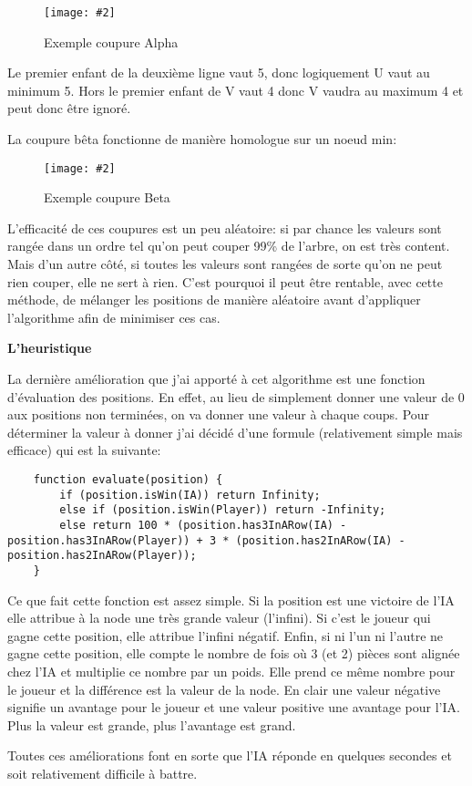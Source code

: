\documentclass[a4paper]{article}
\newcommand{\img}[3][]{
    \begin{figure}[H]
        \centering
        \texttt{[image: \#2]}
        \caption{#1}    
    \end{figure}
}
\newcommand{\ptitle}[1]{\vspace{10pt}
{\large \noindent \textbf{#1}}}
\begin{document}
    \img[Exemple coupure Alpha]{Images/AlphaCutDemo.png}{0.3}

    Le premier enfant de la deuxième ligne vaut 5, donc logiquement U vaut au minimum 5. Hors le premier enfant de V vaut 4 donc V vaudra au maximum 4 et peut donc être ignoré.

    La coupure bêta fonctionne de manière homologue sur un noeud min: 
    \img[Exemple coupure Beta]{Images/BetaCutDemo.png}{0.3}

    L'efficacité de ces coupures est un peu aléatoire: si par chance les valeurs sont rangée dans un ordre tel qu'on peut couper 99\% de l'arbre, on est très content. Mais d'un autre côté, si toutes les valeurs sont rangées de sorte qu'on ne peut rien couper, elle ne sert à rien. C'est pourquoi il peut être rentable, avec cette méthode, de mélanger les positions de manière aléatoire avant d'appliquer l'algorithme afin de minimiser ces cas.

    \ptitle{L'heuristique}

    La dernière amélioration que j'ai apporté à cet algorithme est une fonction d'évaluation des positions. En effet, au lieu de simplement donner une valeur de 0 aux positions non terminées, on va donner une valeur à chaque coups. Pour déterminer la valeur à donner j'ai décidé d'une formule (relativement simple mais efficace) qui est la suivante: 
    \begin{lstlisting}
    function evaluate(position) {
        if (position.isWin(IA)) return Infinity;
        else if (position.isWin(Player)) return -Infinity;
        else return 100 * (position.has3InARow(IA) - position.has3InARow(Player)) + 3 * (position.has2InARow(IA) - position.has2InARow(Player));
    }
    \end{lstlisting}
    Ce que fait cette fonction est assez simple. Si la position est une victoire de l'IA elle attribue à la node une très grande valeur (l'infini). Si c'est le joueur qui gagne cette position, elle attribue l'infini négatif. Enfin, si ni l'un ni l'autre ne gagne cette position, elle compte le nombre de fois où 3 (et 2) pièces sont alignée chez l'IA et multiplie ce nombre par un poids. Elle prend ce même nombre pour le joueur et la différence est la valeur de la node. En clair une valeur négative signifie un avantage pour le joueur et une valeur positive une avantage pour l'IA. Plus la valeur est grande, plus l'avantage est grand.

    Toutes ces améliorations font en sorte que l'IA réponde en quelques secondes et soit relativement difficile à battre.
\end{document}
